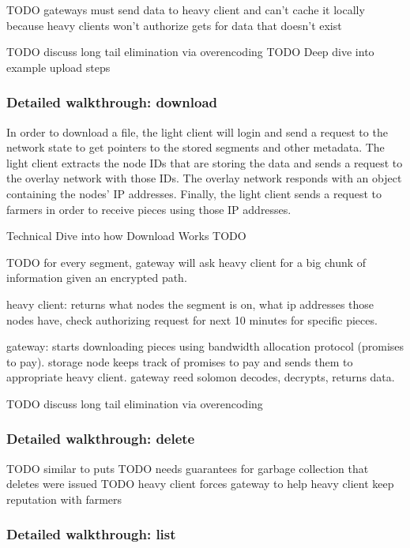 \documentclass[a4paper,10pt]{article} \usepackage[utf8]{inputenc}
\newcommand{\todo}[1]{{\color{red} TODO #1 }}
\begin{document}
\todo{gateways must send data to heavy client and can't cache it locally because
heavy clients won't authorize gets for data that doesn't exist}

\todo{discuss long tail elimination via overencoding}
\todo{Deep dive into example upload steps}

\subsubsection{Detailed walkthrough: download}

In order to download a file, the light
client will login and send a request to the network state to get pointers to the
stored segments and other metadata. The light client extracts the node IDs that
are storing the data and sends a request to the overlay network with those IDs.
The overlay network responds with an object containing the nodes' IP addresses.
Finally, the light client sends a request to farmers in order to receive pieces
using those IP addresses.

Technical Dive into how Download Works \todo{}

\todo{
  for every segment, gateway will ask heavy client for a big chunk of
  information given an encrypted path.

  heavy client: returns what nodes the segment is on, what ip addresses those
    nodes have, check authorizing request for next 10 minutes for
    specific pieces.

  gateway: starts downloading pieces using bandwidth allocation protocol
    (promises to pay). storage node keeps track of promises to pay and sends
    them to appropriate heavy client.
  gateway reed solomon decodes, decrypts, returns data.

}

\todo{discuss long tail elimination via overencoding}

\subsubsection{Detailed walkthrough: delete}

\todo{similar to puts}
\todo{needs guarantees for garbage collection that deletes were issued}
\todo{heavy client forces gateway to help heavy client keep reputation with
      farmers}

\subsubsection{Detailed walkthrough: list}
\end{document}
